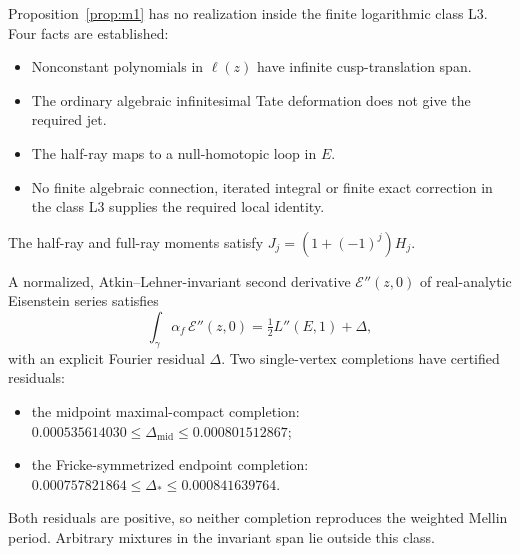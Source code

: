 \begin{researchrecord}\label{obs:mellin}
Proposition~\ref{prop:m1} has no realization inside the finite logarithmic class L3. Four facts are established:
\begin{itemize}[leftmargin=*]
\item Nonconstant polynomials in $\ell(z)$ have infinite cusp-translation span.
\item The ordinary algebraic infinitesimal Tate deformation does not give the required jet.
\item The half-ray maps to a null-homotopic loop in $E$.
\item No finite algebraic connection, iterated integral or finite exact correction in the class L3 supplies the required local identity.
\end{itemize}
The half-ray and full-ray moments satisfy $J_j=(1+(-1)^j)H_j$.
\end{researchrecord}

\begin{researchrecord}\label{obs:jet}
A normalized, Atkin--Lehner-invariant second derivative $\mathcal E''(z,0)$ of real-analytic Eisenstein series satisfies
\[
\int_\gamma\alpha_f\,\mathcal E''(z,0)=\tfrac12L''(E,1)+\Delta ,
\]
with an explicit Fourier residual $\Delta$. Two single-vertex completions have certified residuals:
\begin{itemize}[leftmargin=*]
\item the midpoint maximal-compact completion: $0.000535614030\le\Delta_{\mathrm{mid}}\le0.000801512867$;
\item the Fricke-symmetrized endpoint completion: $0.000757821864\le\Delta_*\le0.000841639764$.
\end{itemize}
Both residuals are positive, so neither completion reproduces the weighted Mellin period. Arbitrary mixtures in the invariant span lie outside this class.
\end{researchrecord}

